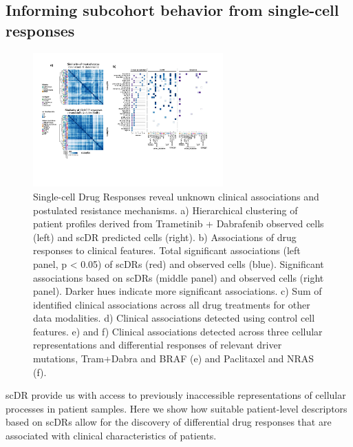 \subsection{Informing subcohort behavior from single-cell responses}
\begin{figure}[htp!]
  \begin{center}
    \includegraphics[width=0.65\textwidth]{figures/cellot-cohort/iid-associations.pdf}
  \end{center}
  \caption{
  Single-cell Drug Responses reveal unknown clinical associations and postulated resistance mechanisms.
a) Hierarchical clustering of patient profiles derived from Trametinib + Dabrafenib observed cells (left) and scDR predicted cells (right).
b) Associations of drug responses to clinical features. Total significant associations (left panel, p < 0.05) of scDRs (red) and observed cells (blue). Significant associations based on scDRs (middle panel) and observed cells (right panel). Darker hues indicate more significant associations.
c) Sum of identified clinical associations across all drug treatments for other data modalities.
d) Clinical associations detected using control cell features.
e) and f) Clinical associations detected across three cellular representations and differential responses of relevant driver mutations, Tram+Dabra and BRAF (e) and Paclitaxel and NRAS (f).
}
  \label{fig:iid-associations}
\end{figure}

scDR provide us with access to previously inaccessible representations of cellular processes in patient samples.
Here we show how suitable patient-level descriptors based on scDRs allow for the discovery of differential drug responses that are associated with clinical characteristics of patients.


